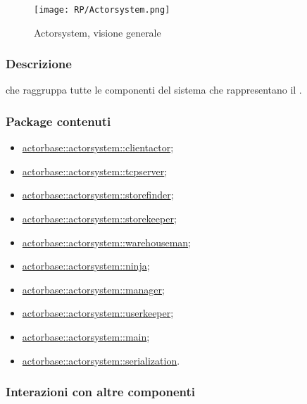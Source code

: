 \documentclass{scalatekids-article}
\begin{document}
\begin{figure}[H]
  \begin{center}
    \texttt{[image: RP/Actorsystem.png]}
    \caption{Actorsystem, visione generale}
  \end{center}
\end{figure}

\subsubsection{Descrizione}

 che raggruppa tutte le componenti del sistema che
rappresentano il .

\subsubsection{Package contenuti}

\begin{itemize}
\item \hyperref[sec:actorbase::actorsystem::clientactor]{actorbase::actorsystem::clientactor};
\item \hyperref[sec:actorbase::actorsystem::tcpserver]{actorbase::actorsystem::tcpserver};
\item \hyperref[sec:actorbase::actorsystem::storefinder]{actorbase::actorsystem::storefinder};
\item \hyperref[sec:actorbase::actorsystem::storekeeper]{actorbase::actorsystem::storekeeper};
\item \hyperref[sec:actorbase::actorsystem::warehouseman]{actorbase::actorsystem::warehouseman};
\item \hyperref[sec:actorbase::actorsystem::ninja]{actorbase::actorsystem::ninja};
\item \hyperref[sec:actorbase::actorsystem::manager]{actorbase::actorsystem::manager};
\item \hyperref[sec:actorbase::actorsystem::userkeeper]{actorbase::actorsystem::userkeeper};
\item \hyperref[sec:actorbase::actorsystem::main]{actorbase::actorsystem::main};
\item \hyperref[sec:actorbase::actorsystem::serialization]{actorbase::actorsystem::serialization}.
\end{itemize}

\subsubsection{Interazioni con altre componenti}
\end{document}
